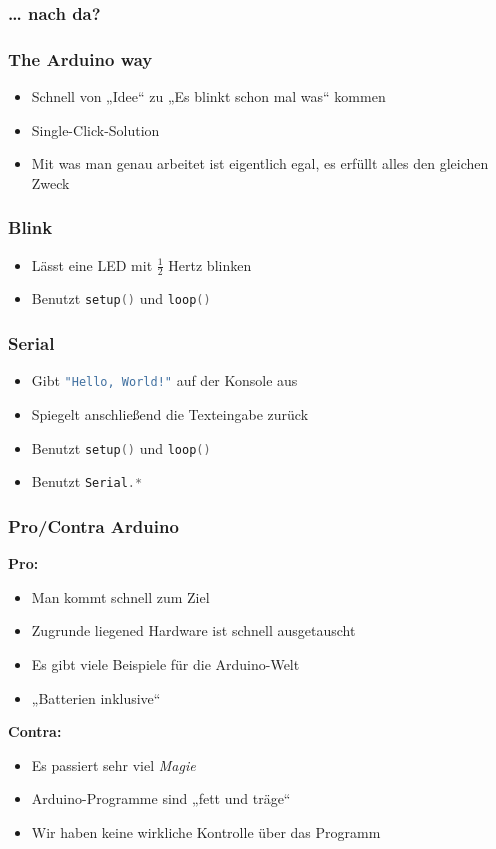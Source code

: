\documentclass{beamer}
\begin{document}
\begin{frame}
\frametitle{… nach da?}

\end{frame}

\begin{frame}
\frametitle{The Arduino way}
\begin{itemize}
\item Schnell von „Idee“ zu „Es blinkt schon mal was“ kommen
\item Single-Click-Solution
\item Mit was man genau arbeitet ist eigentlich egal, es erfüllt alles den gleichen Zweck 
\end{itemize}
\end{frame}

\begin{frame}
\frametitle{Blink}
\begin{itemize}
\item Lässt eine LED mit \(\frac{1}{2}\) Hertz blinken
\item Benutzt \lstinline[language=C]{setup()} und \lstinline[language=C]{loop()}
\end{itemize}

\end{frame}

\begin{frame}
\frametitle{Serial}
\begin{itemize}
\item Gibt \lstinline[language=C]{"Hello, World!"} auf der Konsole aus
\item Spiegelt anschließend die Texteingabe zurück
\item Benutzt \lstinline[language=C]{setup()} und \lstinline[language=C]{loop()}
\item Benutzt \lstinline[language=C]{Serial.*}
\end{itemize}

\end{frame}

\begin{frame}
\frametitle{Pro/Contra Arduino}

\textbf{Pro:}
\begin{itemize}
\item Man kommt schnell zum Ziel
\item Zugrunde liegened Hardware ist schnell ausgetauscht
\item Es gibt viele Beispiele für die Arduino-Welt
\item „Batterien inklusive“
\end{itemize}

\textbf{Contra:}
\begin{itemize}
\item Es passiert sehr viel \textit{Magie}
\item Arduino-Programme sind „fett und träge“
\item Wir haben keine wirkliche Kontrolle über das Programm
\end{itemize}
  
\end{frame}
\end{document}
